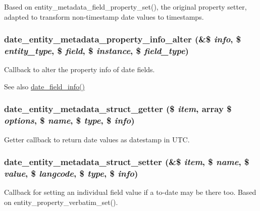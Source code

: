 Based on entity\_\-metadata\_\-field\_\-property\_\-set(), the original property setter, adapted to transform non-\/timestamp date values to timestamps. \hypertarget{date_8module_a16e6d6583949a1efc1c2bd37dec9dd4c}{
\subsubsection[{date\_\-entity\_\-metadata\_\-property\_\-info\_\-alter}]{\setlength{\rightskip}{0pt plus 5cm}date\_\-entity\_\-metadata\_\-property\_\-info\_\-alter (\&\$ {\em info}, \/  \$ {\em entity\_\-type}, \/  \$ {\em field}, \/  \$ {\em instance}, \/  \$ {\em field\_\-type})}}
\label{date_8module_a16e6d6583949a1efc1c2bd37dec9dd4c}
Callback to alter the property info of date fields.

\begin{DoxySeeAlso}{See also}
\hyperlink{date_8field_8inc_a225438cc0aa0654ee5b8c196f0566eaf}{date\_\-field\_\-info()} 
\end{DoxySeeAlso}
\hypertarget{date_8module_a59fadd336a80f44f79cab03888e72950}{
\subsubsection[{date\_\-entity\_\-metadata\_\-struct\_\-getter}]{\setlength{\rightskip}{0pt plus 5cm}date\_\-entity\_\-metadata\_\-struct\_\-getter (\$ {\em item}, \/  array \$ {\em options}, \/  \$ {\em name}, \/  \$ {\em type}, \/  \$ {\em info})}}
\label{date_8module_a59fadd336a80f44f79cab03888e72950}
Getter callback to return date values as datestamp in UTC. \hypertarget{date_8module_a0f666620a7ddc90ff3480c637fda8f30}{
\subsubsection[{date\_\-entity\_\-metadata\_\-struct\_\-setter}]{\setlength{\rightskip}{0pt plus 5cm}date\_\-entity\_\-metadata\_\-struct\_\-setter (\&\$ {\em item}, \/  \$ {\em name}, \/  \$ {\em value}, \/  \$ {\em langcode}, \/  \$ {\em type}, \/  \$ {\em info})}}
\label{date_8module_a0f666620a7ddc90ff3480c637fda8f30}
Callback for setting an individual field value if a to-\/date may be there too. Based on entity\_\-property\_\-verbatim\_\-set().

